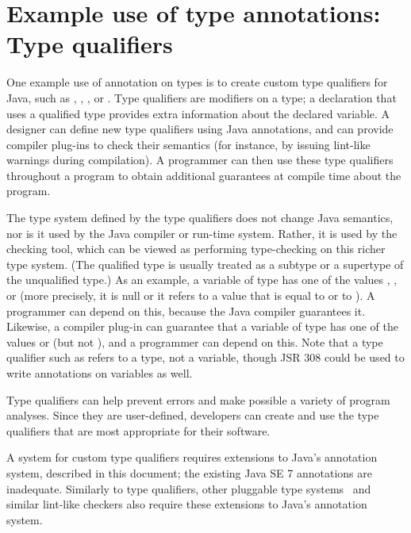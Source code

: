 \documentclass[10pt]{article}
\begin{document}

\label{page:non-normative-start}

\appendix

\section{Example use of type annotations:  Type qualifiers\label{type-qualifiers}}

One example use of annotation on types is to create custom type qualifiers
for Java,
such as , , , or .
Type qualifiers are modifiers on a type; a declaration that uses a
qualified type provides extra
information about the declared variable.
A designer can define new type
qualifiers using Java annotations, and can provide compiler plug-ins to check
their semantics (for instance, by issuing lint-like warnings during
compilation).
A programmer can then use these type qualifiers
throughout a program to obtain additional guarantees at compile time
about the program.

The type system defined by the type qualifiers does not change Java
semantics, nor is it used by the Java compiler or run-time system.  Rather,
it is used by the checking tool, which can be viewed as performing
type-checking on this richer type system.  (The qualified type is usually
treated as a subtype or a supertype of the unqualified type.)
As an example, a variable of type  has one of the values
, , or  (more precisely, it is null or it
refers to a value that is equal to  or to \@).  A
programmer can depend on this, because the Java compiler guarantees it.
Likewise, a compiler plug-in can guarantee that a variable of type
 has one of the values  or 
(but not ), and a programmer can depend on this.  Note that a
type qualifier such as  refers to a type, not a variable,
though JSR 308 could be used to write annotations on variables as well.

Type qualifiers can help prevent errors and make possible a variety of
program analyses.  Since they are user-defined, developers can create
and use the type qualifiers that are most appropriate for their
software.

A system for custom type qualifiers requires
extensions to Java's annotation system, described in this document; the
existing Java SE 7 annotations are inadequate.
Similarly to type qualifiers, other pluggable type
systems~\cite{Bracha2004} and similar lint-like checkers also require these
extensions to Java's annotation system.
\end{document}
